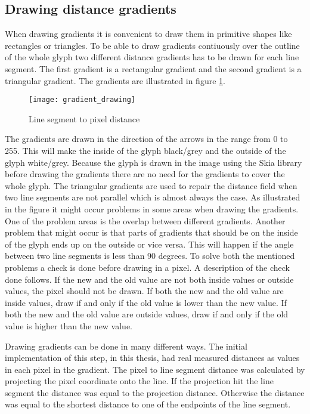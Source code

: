 \subsection{Drawing distance gradients}
When drawing gradients it is convenient to draw them in primitive shapes like rectangles or triangles. To be able to draw gradients contiuously over the outline of the whole glyph two different distance gradients has to be drawn for each line segment. The first gradient is a rectangular gradient and the second gradient is a triangular gradient. The gradients are illustrated in figure \ref{fig:grad}.

\begin{figure}[H]
\texttt{[image: gradient\_drawing]}
\caption{Line segment to pixel distance}
\label{fig:grad}
\end{figure}

The gradients are drawn in the direction of the arrows in the range from 0 to 255. This will make the inside of the glyph black/grey and the outside of the glyph white/grey. Because the glyph is drawn in the image using the Skia library before drawing the gradients there are no need for the gradients to cover the whole glyph. The triangular gradients are used to repair the distance field when two line segments are not parallel which is almost always the case. As illustrated in the figure it might occur problems in some areas when drawing the gradients. One of the problem areas is the overlap between different gradients. Another problem that might occur is that parts of gradients that should be on the inside of the glyph ends up on the outside or vice versa. This will happen if the angle between two line segments is less than 90 degrees. To solve both the mentioned problems a check is done before drawing in a pixel. A description of the check done follows. If the new and the old value are not both inside values or outside values, the pixel should not be drawn. If both the new and the old value are inside values, draw if and only if the old value is lower than the new value. If both the new and the old value are outside values, draw if and only if the old value is higher than the new value.

Drawing gradients can be done in many different ways. The initial implementation of this step, in this thesis, had real measured distances as values in each pixel in the gradient. The pixel to line segment distance was calculated by projecting the pixel coordinate onto the line. If the projection hit the line segment the distance was equal to the projection distance. Otherwise the distance was equal to the shortest distance to one of the endpoints of the line segment.

